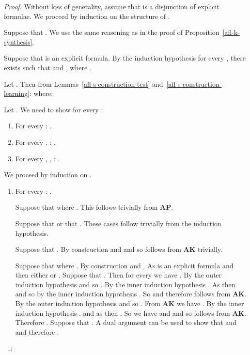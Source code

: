\documentclass[twoside]{aiml14}
\begin{document}
  \begin{proof}
      Without loss of generality, assume that  is a disjunction of
      explicit formulae. We proceed by induction on the structure of .

      Suppose that . We use the same reasoning as in the
      proof of Proposition~\ref{afl-k-synthesis}.

      Suppose that  is an explicit formula.
      By the induction hypothesis for every ,  
      there exists 
      such that  and ,
      where .

      Let .
      Then from Lemmas~\ref{afl-s-construction-test} and~\ref{afl-s-construction-learning}:  where:
      

      Let . We need to show for every :

      \begin{enumerate}
          \item For every : .
          \item For every , : .
          \item For every , , : .
      \end{enumerate}

      We proceed by induction on .

      \begin{enumerate}
          \item For every : .

              Suppose that  where . 
              This follows trivially from {\bf AP}.

              Suppose that  or that . These cases follow trivially from the induction hypothesis.

              Suppose that .
              By construction  
              and  
              and so 
              follows from {\bf AK} trivially.

              Suppose that  where . 
              By construction  
              and .
              As  is an explicit formula and  
              then either  
              or .
              Suppose that .
              Then for every  we have .
              By the outer induction hypothesis 
              and so .
              By the inner induction hypothesis .
              As  then 
              and so by the inner induction hypothesis .
              So  
              and therefore  follows from {\bf AK}.
              By the outer induction hypothesis 
              and so .
              From {\bf AK} we have .
              By the inner induction hypothesis .
              and as 
              then .
              So we have 
              and 
              and so  follows from {\bf AK}.
              Therefore .
              Suppose that .
              A dual argument can be used to show that  
              and 
              and therefore .


\end{enumerate}
\end{proof}
\end{document}
